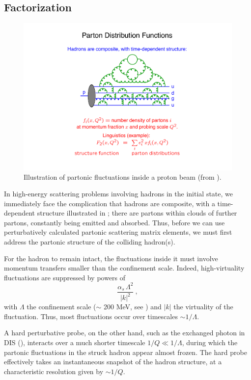 \subsection{Factorization \label{sec:factorization}}
\begin{figure}[t]
\begin{center}
\includegraphics*[scale=0.55]{pdfs.pdf}
\caption{Illustration
  of partonic fluctuations inside a proton beam  (from
 \cite{Sjostrand:2006su}). 
\label{fig:pdfs}}
\end{center}
\end{figure}
In high-energy scattering problems involving hadrons in the initial
state, we immediately face the complication that hadrons are composite,
with a time-dependent structure illustrated in
; there are partons  within clouds of further partons,
constantly being emitted and absorbed. Thus, before we can use
perturbatively calculated partonic scattering matrix elements, we must
first address the partonic structure of the colliding hadron(s). 

For the hadron to remain intact, the fluctuations inside it must involve
momentum transfers smaller than the confinement scale. Indeed,
high-virtuality fluctuations are suppressed by powers of
\begin{equation}
\frac{\alpha_s\, \Lambda^2}{|k|^2}~,
\end{equation}
with $\Lambda$ the confinement scale ($\sim$ 200 MeV,
 see ) and $|k|$ the virtuality of the
fluctuation. Thus, most fluctuations occur over timescales 
$\sim 1/\Lambda$. 

%
A hard perturbative probe, on the other hand, such as the exchanged
photon in DIS (), interacts over a much shorter
timescale $1/Q \ll 1/\Lambda$, during which the partonic fluctuations in
the struck hadron appear almost frozen. The hard probe effectively takes
an instantaneous snapshot of the hadron structure, at a characteristic
resolution given by $\sim 1/Q$.

